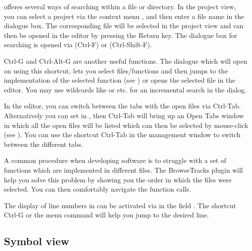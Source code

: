 

\codeblocks offeres several ways of searching within a file or directory. In the project view, you can select a project via the context menu , and then enter a file name in the dialogue box. The corresponding file will be selected in the project view and can then be opened in the editor by pressing the Return key. The dialogue box for searching is opened via  (Ctrl-F) or  (Ctrl-Shift-F).

Ctrl-G and Ctrl-Alt-G are another useful functions. The dialogue which will open on using this shortcut, lets you select files/functions and then jumps to the implementation of the selected function (see ) or opens the selected file in the editor. You may use wildcards like \codeline{*} or  etc. for an incremental search in the dialog.



In the editor, you can switch between the tabs with the open files via Ctrl-Tab. Alternatively you can set  in , then Ctrl-Tab will bring up an Open Tabs window in which all the open files will be listed which can then be selected by mouse-click (see ). You can use the shortcut Ctrl-Tab in the management window to switch between the different tabs.


A common procedure when developing software is to struggle with a set of functions which are implemented in different files. The BrowseTracks plugin will help you solve this problem by showing you the order in which the files were selected. You can then comfortably navigate the function calls.

The display of line numbers in \codeblocks can be activated via  in the field . The shortcut Ctrl-G or the menu command  will help you jump to the desired line.

\subsection{Symbol view}

